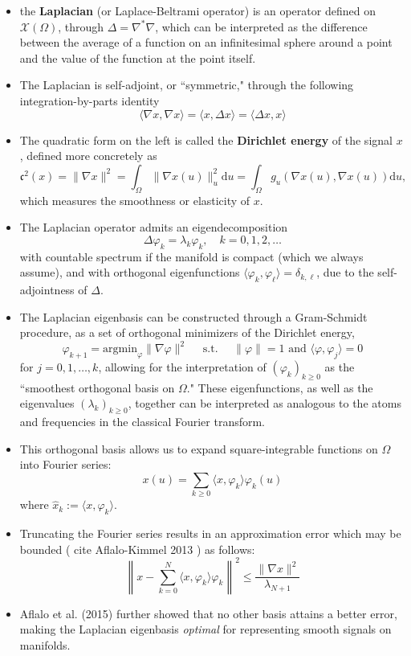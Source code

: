 \documentclass[12pt]{article}
\numberwithin{equation}{section}
\theoremstyle{definition}
\newcommand{		\cX		}	{	\mathcal{X}				}
\newcommand{		\ra		}	{	\rangle					}
\newcommand{		\la		}	{	\langle					}
\newcommand{		\B		}	{\textbf					} %
\newcommand{		\vp		}	{	\varphi					}
\newcommand{		\Oh		}	{	\Omega					}
\newcommand{		\1		}	{	\bm{1}					}%
\begin{document}
\begin{itemize}
\item the \B{Laplacian} (or Laplace-Beltrami operator) is an operator defined on $\cX(\Oh)$, through $\Delta = \nabla^* \nabla$, which can be interpreted as the difference between the average of a function on an infinitesimal sphere around a point and the value of the function at the point itself. 

\item The Laplacian is self-adjoint, or ``symmetric," through the following integration-by-parts identity
$$
\langle \nabla x , \nabla x \rangle = \langle x, \Delta x \rangle = \langle \Delta x, x \rangle 
$$
\item The quadratic form on the left is called the \B{Dirichlet energy} of the signal $x$, defined more concretely as
$$
\mathfrak{c}^2(x) = \| \nabla x\|^2 = \int_\Oh \| \nabla x(u) \|_u^2 \textrm{d} u = \int_{\Oh} g_u ( \nabla x(u), \nabla x(u)) \textrm{d}u ,
$$
which measures the smoothness or elasticity of $x$.
\item The Laplacian operator admits an eigendecomposition
$$
\Delta \varphi_k = \lambda_k \varphi_k , \quad k = 0,1,2,\dots
$$
with countable spectrum if the manifold is compact (which we always assume), and with orthogonal eigenfunctions $\la \varphi_k, \varphi_\ell \ra = \delta_{k,\ell}$, due to the self-adjointness of $\Delta$. 
\item The Laplacian eigenbasis can be constructed through a Gram-Schmidt procedure, as a set of orthogonal minimizers of the Dirichlet energy,
$$
\varphi_{k+1} = \text{argmin}_\varphi \| \nabla \varphi \|^2 \quad \text{ s.t. } \quad \| \varphi \| = 1 \text{ and } \la \varphi, \varphi_j \ra = 0
$$
for $j = 0,1, \dots, k$, allowing for the interpretation of $(\varphi_k)_{k \geq 0}$ as the ``smoothest orthogonal basis on $\Oh$." These eigenfunctions, as well as the eigenvalues $(\lambda_k)_{k \geq 0}$, together can be interpreted as analogous to the atoms and frequencies in the classical Fourier transform. 
\item This orthogonal basis allows us to expand square-integrable functions on $\Omega$ into Fourier series:
$$
x(u) = \sum_{ k \geq 0 } \la x , \varphi_k \ra \varphi_k(u) 
$$
where $\hat{x}_k := \la x, \vp_k \ra$.
\item Truncating the Fourier series results in an approximation error which may be bounded ( \cite{BBCV21} cite Aflalo-Kimmel 2013 ) as follows: 
$$
\left\| 
x - \sum_{k = 0}^N 
\la x, \vp_k \ra\vp_k 
\right\|^2
\leq
\frac{
\| \nabla x \|^2
}
{
\lambda_{N+1}
}
$$
\item Aflalo et al. (2015) further showed that no other basis attains a better error, making the Laplacian eigenbasis \emph{optimal} for representing smooth signals on manifolds. 
\end{itemize}
\end{document}
